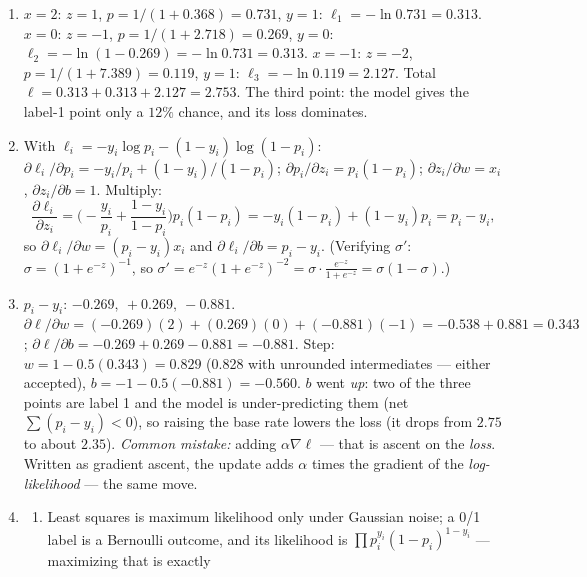 \documentclass[
  11pt,
]{article}
\providecommand{\tightlist}{%
  \setlength{\itemsep}{0pt}\setlength{\parskip}{0pt}}
\newcommand{\answerspace}[1]{\par\vspace*{#1}}  %
\begin{document}
\answerspace{1.8in}

\begin{solutionbox}

\begin{enumerate}
\def\labelenumi{(\alph{enumi})}
\item
  \(x=2\): \(z = 1\), \(p = 1/(1+0.368) = 0.731\), \(y=1\):
  \(\ell_1 = -\ln 0.731 = 0.313\). \(x=0\): \(z=-1\),
  \(p = 1/(1+2.718) = 0.269\), \(y=0\):
  \(\ell_2 = -\ln(1-0.269) = -\ln 0.731 = 0.313\). \(x=-1\): \(z=-2\),
  \(p = 1/(1+7.389) = 0.119\), \(y=1\): \(\ell_3 = -\ln 0.119 = 2.127\).
  Total \(\ell = 0.313+0.313+2.127 = 2.753\). The third point: the model
  gives the label-1 point only a \(12\%\) chance, and its loss
  dominates.
\item
  With \(\ell_i = -y_i\log p_i - (1-y_i)\log(1-p_i)\):
  \(\partial\ell_i/\partial p_i = -y_i/p_i + (1-y_i)/(1-p_i)\);
  \(\partial p_i/\partial z_i = p_i(1-p_i)\);
  \(\partial z_i/\partial w = x_i\), \(\partial z_i/\partial b = 1\).
  Multiply:
  \[\frac{\partial\ell_i}{\partial z_i} = \Big(-\frac{y_i}{p_i} + \frac{1-y_i}{1-p_i}\Big)p_i(1-p_i)
  = -y_i(1-p_i) + (1-y_i)p_i = p_i - y_i,\] so
  \(\partial\ell_i/\partial w = (p_i-y_i)x_i\) and
  \(\partial\ell_i/\partial b = p_i-y_i\). (Verifying \(\sigma'\):
  \(\sigma = (1+e^{-z})^{-1}\), so
  \(\sigma' = e^{-z}(1+e^{-z})^{-2} = \sigma\cdot\frac{e^{-z}}{1+e^{-z}} = \sigma(1-\sigma)\).)
\item
  \(p_i - y_i\): \(-0.269,\ +0.269,\ -0.881\).
  \(\partial\ell/\partial w = (-0.269)(2) + (0.269)(0) + (-0.881)(-1) = -0.538 + 0.881 = 0.343\);
  \(\partial\ell/\partial b = -0.269 + 0.269 - 0.881 = -0.881\). Step:
  \(w = 1 - 0.5(0.343) = 0.829\) (0.828 with unrounded intermediates ---
  either accepted), \(b = -1 - 0.5(-0.881) = -0.560\). \(b\) went
  \emph{up}: two of the three points are label 1 and the model is
  under-predicting them (net \(\sum(p_i-y_i) < 0\)), so raising the base
  rate lowers the loss (it drops from \(2.75\) to about \(2.35\)).
  \emph{Common mistake:} adding \(\alpha\nabla\ell\) --- that is ascent
  on the \emph{loss}. Written as gradient ascent, the update adds
  \(\alpha\) times the gradient of the \emph{log-likelihood} --- the
  same move.
\item
  \begin{enumerate}
  \def\labelenumii{(\roman{enumii})}
  \tightlist
  \item
    Least squares is maximum likelihood only under Gaussian noise; a 0/1
    label is a Bernoulli outcome, and its likelihood is
    \(\prod p_i^{y_i}(1-p_i)^{1-y_i}\) --- maximizing that is exactly

\end{enumerate}
\end{enumerate}
\end{solutionbox}
\end{document}
